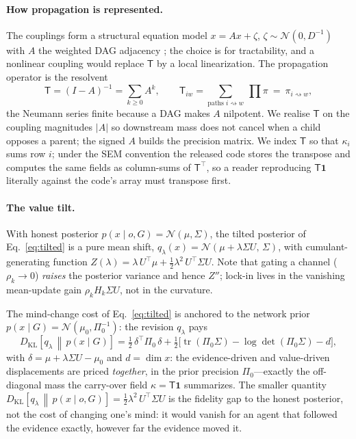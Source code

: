 \documentclass[runningheads]{llncs}
\newcommand{\KL}[2]{D_{\mathrm{KL}}\!\left[#1\,\middle\|\,#2\right]}
\newcommand{\rw}{\rightsquigarrow}
\newcommand{\Top}{\mathsf{T}}          %
\newcommand{\bone}{\mathbf{1}}         %
\begin{document}
\paragraph{How propagation is represented.} The couplings form a structural equation model $x=Ax+\zeta$,
$\zeta\sim\mathcal N(0,D^{-1})$ with $A$ the weighted DAG adjacency \citep{koller2009}; the choice is
for tractability, and a nonlinear coupling would replace $\Top$ by a local linearization. The
propagation operator is the resolvent
\begin{equation}
\Top=(I-A)^{-1}=\sum_{k\ge 0}A^k,\qquad
\Top_{iw}=\!\!\sum_{\text{paths }i\rw w}\ \prod \pi\ =\ \pi_{i\rw w},
\label{eq:Top-full}
\end{equation}
the Neumann series finite because a DAG makes $A$ nilpotent. We realise $\Top$ on the coupling
magnitudes $|A|$ so downstream mass does not cancel when a child opposes a parent; the signed $A$
builds the precision matrix. We index $\Top$ so that $\kappa_i$ sums row $i$; under the SEM
convention the released code stores the transpose and computes the same fields as column-sums of
$\Top^{\!\top}$, so a reader reproducing $\Top\bone$ literally against the code's array must
transpose first.

\paragraph{The value tilt.} With honest posterior $p(x\mid o,G)=\mathcal N(\mu,\Sigma)$, the tilted
posterior of Eq.~\eqref{eq:tilted} is a pure mean shift,
$q_\lambda(x)=\mathcal N(\mu+\lambda\Sigma U,\,\Sigma)$, with cumulant-generating function
$Z(\lambda)=\lambda\,U^{\!\top}\!\mu+\tfrac12\lambda^2\,U^{\!\top}\!\Sigma U$. Note that gating a
channel ($\rho_k\to0$) \emph{raises} the posterior variance and hence $Z''$; lock-in lives in the
vanishing mean-update gain $\rho_k H_k\Sigma U$, not in the curvature.

The mind-change cost of Eq.~\eqref{eq:tilted} is anchored to the network prior
$p(x\mid G)=\mathcal N(\mu_0,\Pi_0^{-1})$: the revision $q_\lambda$ pays
\begin{equation}
\KL{q_\lambda}{p(x\mid G)}
=\tfrac12\,\delta^{\!\top}\Pi_0\,\delta
+\tfrac12\bigl[\operatorname{tr}(\Pi_0\Sigma)-\log\det(\Pi_0\Sigma)-d\bigr],
\label{eq:mindcost}
\end{equation}
with $\delta=\mu+\lambda\Sigma U-\mu_0$ and $d=\dim x$: the evidence-driven and value-driven
displacements are priced \emph{together}, in
the prior precision $\Pi_0$---exactly the off-diagonal mass the carry-over field $\kappa=\Top\bone$
summarizes. The smaller quantity $\KL{q_\lambda}{p(x\mid o,G)}=\tfrac12\lambda^2\,U^{\!\top}\!\Sigma U$
is the fidelity gap to the honest posterior, not the cost of changing one's mind: it would vanish
for an agent that followed the evidence exactly, however far the evidence moved it.
\end{document}
